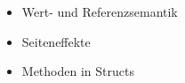 \begin{frame}
    \begin{itemize}
        \item Wert- und Referenzsemantik
        \item Seiteneffekte
        \item Methoden in Structs
    \end{itemize}
\end{frame}